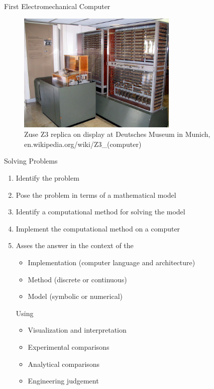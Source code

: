 \documentclass[xcolor=x11names,compress]{beamer}
\renewcommand{\(}{\begin{columns}}
\renewcommand{\)}{\end{columns}}
\newcommand{\<}[1]{\begin{column}{#1}}
\renewcommand{\>}{\end{column}}
\begin{document}
\begin{frame}{First Electromechanical Computer}

\begin{figure}
\includegraphics[height=2.25in,clip]{Z3DeutschesMuseum}
\caption{Zuse Z3 replica on display at Deutsches Museum in Munich, en.wikipedia.org/wiki/Z3\_(computer)}
\end{figure}

\end{frame}

\begin{frame}{Solving Problems}
\begin{enumerate}
\item Identify the problem
\item Pose the problem in terms of a mathematical model
\item Identify a computational method for solving the model
\item Implement the computational method on a computer
\item Asses the answer in the context of the
\begin{itemize}
\item Implementation (computer language and architecture)
\item Method (discrete or continuous)
\item Model (symbolic or numerical)
\end{itemize}
Using
\begin{itemize}
\item Visualization and interpretation
\item Experimental comparisons
\item Analytical comparisons
\item Engineering judgement
\end{itemize}
\end{enumerate}
\end{frame}
\end{document}
